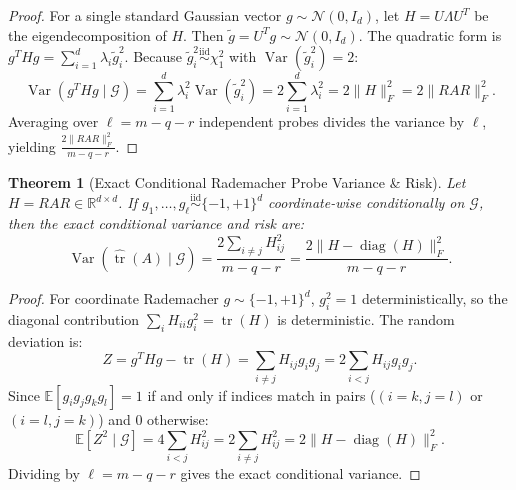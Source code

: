 \documentclass[11pt,letterpaper]{article}
\newtheorem{theorem}{Theorem}
\begin{document}
\begin{proof}
For a single standard Gaussian vector $g \sim \mathcal{N}(0, I_d)$, let $H = U \Lambda U^T$ be the eigendecomposition of $H$. Then $\tilde{g} = U^T g \sim \mathcal{N}(0, I_d)$. The quadratic form is $g^T H g = \sum_{i=1}^d \lambda_i \tilde{g}_i^2$. Because $\tilde{g}_i^2 \overset{\text{iid}}{\sim} \chi_1^2$ with $\operatorname{Var}(\tilde{g}_i^2) = 2$:
\begin{equation}
\operatorname{Var}(g^T H g \mid \mathcal{G}) = \sum_{i=1}^d \lambda_i^2 \operatorname{Var}(\tilde{g}_i^2) = 2 \sum_{i=1}^d \lambda_i^2 = 2 \|H\|_F^2 = 2 \|RAR\|_F^2.
\end{equation}
Averaging over $\ell = m - q - r$ independent probes divides the variance by $\ell$, yielding $\frac{2\|RAR\|_F^2}{m-q-r}$.
\end{proof}

\begin{theorem}[Exact Conditional Rademacher Probe Variance \& Risk]
\label{thm:rademacher_var}
Let $H = RAR \in \mathbb{R}^{d \times d}$. If $g_1, \dots, g_\ell \overset{\text{iid}}{\sim} \{-1, +1\}^d$ coordinate-wise conditionally on $\mathcal{G}$, then the exact conditional variance and risk are:
\begin{equation}
\operatorname{Var}(\widehat{\operatorname{tr}}(A) \mid \mathcal{G}) = \frac{2 \sum_{i \ne j} H_{ij}^2}{m - q - r} = \frac{2 \|H - \operatorname{diag}(H)\|_F^2}{m - q - r}.
\end{equation}
\end{theorem}

\begin{proof}
For coordinate Rademacher $g \sim \{-1, +1\}^d$, $g_i^2 = 1$ deterministically, so the diagonal contribution $\sum_i H_{ii} g_i^2 = \operatorname{tr}(H)$ is deterministic. The random deviation is:
\begin{equation}
Z = g^T H g - \operatorname{tr}(H) = \sum_{i \ne j} H_{ij} g_i g_j = 2 \sum_{i < j} H_{ij} g_i g_j.
\end{equation}
Since $\mathbb{E}[g_i g_j g_k g_l] = 1$ if and only if indices match in pairs ($(i=k, j=l)$ or $(i=l, j=k)$) and 0 otherwise:
\begin{equation}
\mathbb{E}[Z^2 \mid \mathcal{G}] = 4 \sum_{i < j} H_{ij}^2 = 2 \sum_{i \ne j} H_{ij}^2 = 2 \|H - \operatorname{diag}(H)\|_F^2.
\end{equation}
Dividing by $\ell = m - q - r$ gives the exact conditional variance.
\end{proof}
\end{document}
